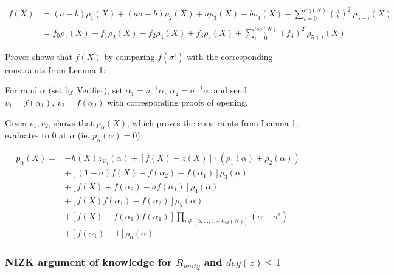 \documentclass{article}
\theoremstyle{definition}
\begin{document}
\begin{small}
\begin{align*}
	f(X) &= (a-b) \rho_1(X) + (a \sigma - b) \rho_2(X) + a \rho_3(X) + b \rho_4(X) + \sum_{i=0}^{log(N)} (\frac{a}{b})^{2^i} \rho_{5+i}(X)\\
	     &= f_0 \rho_1(X) + f_1 \rho_2(X) + f_2 \rho_3(X) + f_3 \rho_4(X) + \sum_{i=0}^{log(N)} (f_4)^{2^i} \rho_{5+i}(X)
\end{align*}
\end{small}

Prover shows that $f(X)$ by comparing $f(\sigma^i)$ with the corresponding constraints from Lemma 1:

For rand $\alpha$ (set by Verifier), set $\alpha_1 = \sigma^{-1} \alpha,~\alpha_2= \sigma^{-2} \alpha$, and send $v_1=f(\alpha_1),~v_2=f(\alpha_2)$ with corresponding proofs of opening.

Given $v_1, v_2$, shows that $p_{\alpha}(X)$, which proves the constraints from Lemma 1, evaluates to $0$ at $\alpha$ (ie. $p_{\alpha}(\alpha)=0$).

\begin{align*}
	p_{\alpha}(X) = &-h(X) z_{V_n}(\alpha) + [f(X)-z(X)]\cdot (\rho_1(\alpha) + \rho_2(\alpha))\\
			&+ [(1-\sigma) f(X) - f(\alpha_2) + f(\alpha_1)] \rho_3(\alpha)\\
			&+ [f(X) + f(\alpha_2) - \sigma f(\alpha_1)] \rho_4(\alpha)\\
			&+ [f(X) f(\alpha_1) - f(\alpha_2)] \rho_5(\alpha)\\
			&+ [f(X) - f(\alpha_1) f(\alpha_1)] \prod_{i \notin [5, \ldots, 4+log(N)]} (\alpha - \sigma^i)\\
			&+ [f(\alpha_1)-1] \rho_n(\alpha)
\end{align*}

\subsubsection{\texorpdfstring{NIZK argument of knowledge for $R_{unity}$ and $deg(z)\leq 1$}%
				{NIZK argument of knowledge for Runity and deg(z)<=1}}
\end{document}
